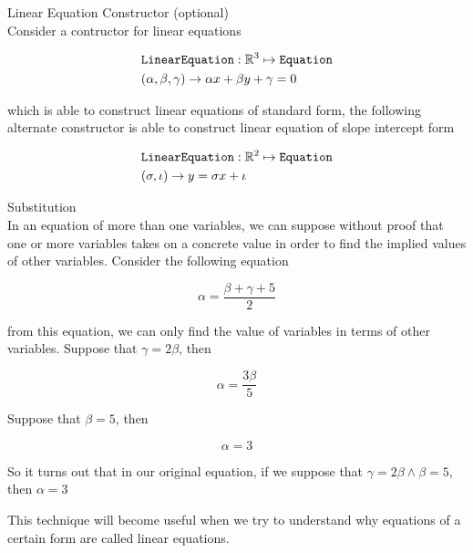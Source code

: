 \documentclass{book}
\begin{document}
  {\remark Linear Equation Constructor (optional) \\
    Consider a contructor for linear equations

    \begin{align*}
      & \text{\texttt{LinearEquation}}: \mathbb{R}^3 \mapsto \text{\texttt{Equation}}\\
      & (\alpha, \beta, \gamma) \to \alpha x + \beta y + \gamma = 0
    \end{align*}

    which is able to construct linear equations of standard form, the following alternate constructor is able to construct linear equation of slope intercept form

    \begin{align*}
      & \text{\texttt{LinearEquation}}: \mathbb{R}^2 \mapsto \text{\texttt{Equation}}\\
      & (\sigma, \iota) \to y = \sigma x + \iota
    \end{align*}
  }

  {\remark Substitution \\

    In an equation of more than one variables, we can suppose without proof that one or more variables takes on a concrete value in order to find the implied values of other variables. Consider the following equation

    $$\alpha = \frac{\beta + \gamma + 5}{2}$$

    from this equation, we can only find the value of variables in terms of other variables. Suppose that $\gamma = 2\beta$, then

    $$\alpha = \frac{3\beta}{5}$$

    Suppose that $\beta = 5$, then

    $$\alpha = 3$$

    So it turns out that in our original equation, if we suppose that $\gamma = 2\beta \land \beta = 5$, then $\alpha = 3$

    This technique will become useful when we try to understand why equations of a certain form are called linear equations.\\
  }
\end{document}
